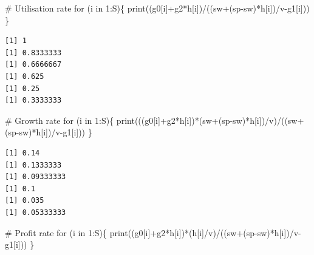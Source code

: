 \documentclass[
  letterpaper,
  DIV=11,
  numbers=noendperiod]{scrreprt}
\newenvironment{Shaded}{\begin{snugshade}}{\end{snugshade}}
\newcommand{\CommentTok}[1]{\textcolor[rgb]{0.37,0.37,0.37}{#1}}
\newcommand{\ControlFlowTok}[1]{\textcolor[rgb]{0.00,0.23,0.31}{#1}}
\newcommand{\DecValTok}[1]{\textcolor[rgb]{0.68,0.00,0.00}{#1}}
\newcommand{\FunctionTok}[1]{\textcolor[rgb]{0.28,0.35,0.67}{#1}}
\newcommand{\NormalTok}[1]{\textcolor[rgb]{0.00,0.23,0.31}{#1}}
\newcommand{\SpecialCharTok}[1]{\textcolor[rgb]{0.37,0.37,0.37}{#1}}
\begin{document}
\begin{Shaded}
\begin{Highlighting}[]
\CommentTok{\# Utilisation rate}
\ControlFlowTok{for}\NormalTok{ (i }\ControlFlowTok{in} \DecValTok{1}\SpecialCharTok{:}\NormalTok{S)\{}
\FunctionTok{print}\NormalTok{((g0[i]}\SpecialCharTok{+}\NormalTok{g2}\SpecialCharTok{*}\NormalTok{h[i])}\SpecialCharTok{/}\NormalTok{((sw}\SpecialCharTok{+}\NormalTok{(sp}\SpecialCharTok{{-}}\NormalTok{sw)}\SpecialCharTok{*}\NormalTok{h[i])}\SpecialCharTok{/}\NormalTok{v}\SpecialCharTok{{-}}\NormalTok{g1[i]))}
\NormalTok{\}}
\end{Highlighting}
\end{Shaded}

\begin{verbatim}
[1] 1
[1] 0.8333333
[1] 0.6666667
[1] 0.625
[1] 0.25
[1] 0.3333333
\end{verbatim}

\begin{Shaded}
\begin{Highlighting}[]
\CommentTok{\# Growth rate}
\ControlFlowTok{for}\NormalTok{ (i }\ControlFlowTok{in} \DecValTok{1}\SpecialCharTok{:}\NormalTok{S)\{}
  \FunctionTok{print}\NormalTok{(((g0[i]}\SpecialCharTok{+}\NormalTok{g2}\SpecialCharTok{*}\NormalTok{h[i])}\SpecialCharTok{*}\NormalTok{(sw}\SpecialCharTok{+}\NormalTok{(sp}\SpecialCharTok{{-}}\NormalTok{sw)}\SpecialCharTok{*}\NormalTok{h[i])}\SpecialCharTok{/}\NormalTok{v)}\SpecialCharTok{/}\NormalTok{((sw}\SpecialCharTok{+}\NormalTok{(sp}\SpecialCharTok{{-}}\NormalTok{sw)}\SpecialCharTok{*}\NormalTok{h[i])}\SpecialCharTok{/}\NormalTok{v}\SpecialCharTok{{-}}\NormalTok{g1[i]))}
\NormalTok{\}}
\end{Highlighting}
\end{Shaded}

\begin{verbatim}
[1] 0.14
[1] 0.1333333
[1] 0.09333333
[1] 0.1
[1] 0.035
[1] 0.05333333
\end{verbatim}

\begin{Shaded}
\begin{Highlighting}[]
\CommentTok{\# Profit rate}
\ControlFlowTok{for}\NormalTok{ (i }\ControlFlowTok{in} \DecValTok{1}\SpecialCharTok{:}\NormalTok{S)\{}
  \FunctionTok{print}\NormalTok{((g0[i]}\SpecialCharTok{+}\NormalTok{g2}\SpecialCharTok{*}\NormalTok{h[i])}\SpecialCharTok{*}\NormalTok{(h[i]}\SpecialCharTok{/}\NormalTok{v)}\SpecialCharTok{/}\NormalTok{((sw}\SpecialCharTok{+}\NormalTok{(sp}\SpecialCharTok{{-}}\NormalTok{sw)}\SpecialCharTok{*}\NormalTok{h[i])}\SpecialCharTok{/}\NormalTok{v}\SpecialCharTok{{-}}\NormalTok{g1[i]))}
\NormalTok{\}}
\end{Highlighting}
\end{Shaded}
\end{document}
